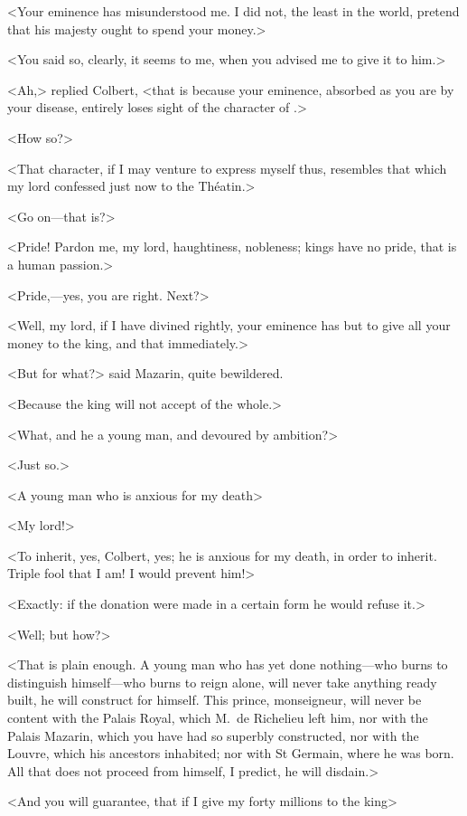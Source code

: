 <Your eminence has misunderstood me. I did not, the least in the world, pretend that his majesty ought to spend your money.>

<You said so, clearly, it seems to me, when you advised me to give it to him.>

<Ah,> replied Colbert, <that is because your eminence, absorbed as you are by your disease, entirely loses sight of the character of .>

<How so?>

<That character, if I may venture to express myself thus, resembles that which my lord confessed just now to the Théatin.>

<Go on—that is?>

<Pride! Pardon me, my lord, haughtiness, nobleness; kings have no pride, that is a human passion.>

<Pride,—yes, you are right. Next?>

<Well, my lord, if I have divined rightly, your eminence has but to give all your money to the king, and that immediately.>

<But for what?> said Mazarin, quite bewildered.

<Because the king will not accept of the whole.>

<What, and he a young man, and devoured by ambition?>

<Just so.>

<A young man who is anxious for my death\longdash>

<My lord!>

<To inherit, yes, Colbert, yes; he is anxious for my death, in order to inherit. Triple fool that I am! I would prevent him!>

<Exactly: if the donation were made in a certain form he would refuse it.>

<Well; but how?>

<That is plain enough. A young man who has yet done nothing—who burns to distinguish himself—who burns to reign alone, will never take anything ready built, he will construct for himself. This prince, monseigneur, will never be content with the Palais Royal, which M.~de Richelieu left him, nor with the Palais Mazarin, which you have had so superbly constructed, nor with the Louvre, which his ancestors inhabited; nor with St Germain, where he was born. All that does not proceed from himself, I predict, he will disdain.>

<And you will guarantee, that if I give my forty millions to the king\longdash>

